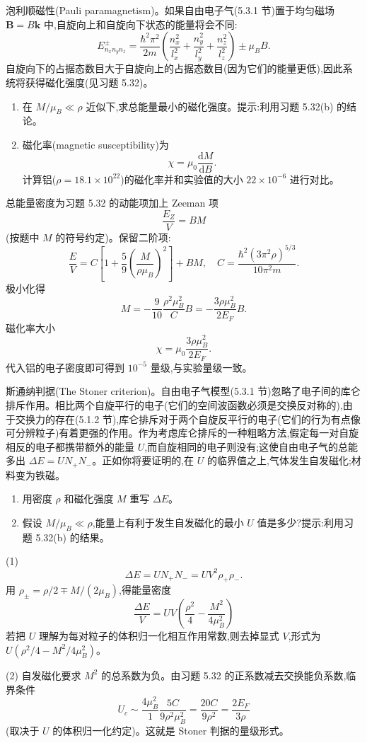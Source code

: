 \begin{question}
泡利顺磁性(Pauli paramagnetism)。如果自由电子气(5.3.1 节)置于均匀磁场 $\mathbf B=B\hat{\mathbf k}$ 中,自旋向上和自旋向下状态的能量将会不同:
\[
E_{n_xn_yn_z}^{\pm}=\frac{\hbar^2\pi^2}{2m}\left(\frac{n_x^2}{l_x^2}+\frac{n_y^2}{l_y^2}+\frac{n_z^2}{l_z^2}\right)\pm \mu_B B.
\]
自旋向下的占据态数目大于自旋向上的占据态数目(因为它们的能量更低),因此系统将获得磁化强度(见习题 5.32)。
\begin{enumerate}
\item 在 $M/\mu_B\ll\rho$ 近似下,求总能量最小的磁化强度。提示:利用习题 5.32(b) 的结论。
\item 磁化率(magnetic susceptibility)为
\[
\chi=\mu_0\frac{\mathrm dM}{\mathrm dB}.
\]
计算铝($\rho=18.1\times10^{22}$)的磁化率并和实验值的大小 $22\times10^{-6}$ 进行对比。
\end{enumerate}
\end{question}
\begin{solution}

总能量密度为习题 5.32 的动能项加上 Zeeman 项
\[
\frac{E_Z}{V}=BM
\]
(按题中 $M$ 的符号约定)。保留二阶项:
\[
\frac EV=C\left[1+\frac59\left(\frac{M}{\rho\mu_B}\right)^2\right]+BM,
\quad C=\frac{\hbar^2(3\pi^2\rho)^{5/3}}{10\pi^2m}.
\]
极小化得
\[
M=-\frac{9}{10}\frac{\rho^2\mu_B^2}{C}B
=-\frac{3\rho\mu_B^2}{2E_F}B.
\]
磁化率大小
\[
\chi=\mu_0\frac{3\rho\mu_B^2}{2E_F}.
\]
代入铝的电子密度即可得到 $10^{-5}$ 量级,与实验量级一致。

\end{solution}

\begin{question}
斯通纳判据(The Stoner criterion)。自由电子气模型(5.3.1 节)忽略了电子间的库仑排斥作用。相比两个自旋平行的电子(它们的空间波函数必须是交换反对称的),由于交换力的存在(5.1.2 节),库仑排斥对于两个自旋反平行的电子(它们的行为有点像可分辨粒子)有着更强的作用。作为考虑库仑排斥的一种粗略方法,假定每一对自旋相反的电子都携带额外的能量 $U$,而自旋相同的电子则没有;这使自由电子气的总能多出 $\Delta E=U N_+N_-$。正如你将要证明的,在 $U$ 的临界值之上,气体发生自发磁化;材料变为铁磁。
\begin{enumerate}
\item 用密度 $\rho$ 和磁化强度 $M$ 重写 $\Delta E$。
\item 假设 $M/\mu_B\ll\rho$,能量上有利于发生自发磁化的最小 $U$ 值是多少?提示:利用习题 5.32(b) 的结果。
\end{enumerate}
\end{question}
\begin{solution}

(1) 
\[
\Delta E=UN_+N_-=UV^2\rho_+\rho_-.
\]
用 $\rho_\pm=\rho/2\mp M/(2\mu_B)$,得能量密度
\[
\frac{\Delta E}{V}=UV\left(\frac{\rho^2}{4}-\frac{M^2}{4\mu_B^2}\right)
\]
若把 $U$ 理解为每对粒子的体积归一化相互作用常数,则去掉显式 $V$,形式为 $U(\rho^2/4-M^2/4\mu_B^2)$。

(2) 自发磁化要求 $M^2$ 的总系数为负。由习题 5.32 的正系数减去交换能负系数,临界条件
\[
U_c\sim \frac{4\mu_B^2}{1}\frac{5C}{9\rho^2\mu_B^2}
=\frac{20C}{9\rho^2}
=\frac{2E_F}{3\rho}
\]
(取决于 $U$ 的体积归一化约定)。这就是 Stoner 判据的量级形式。

\end{solution}

